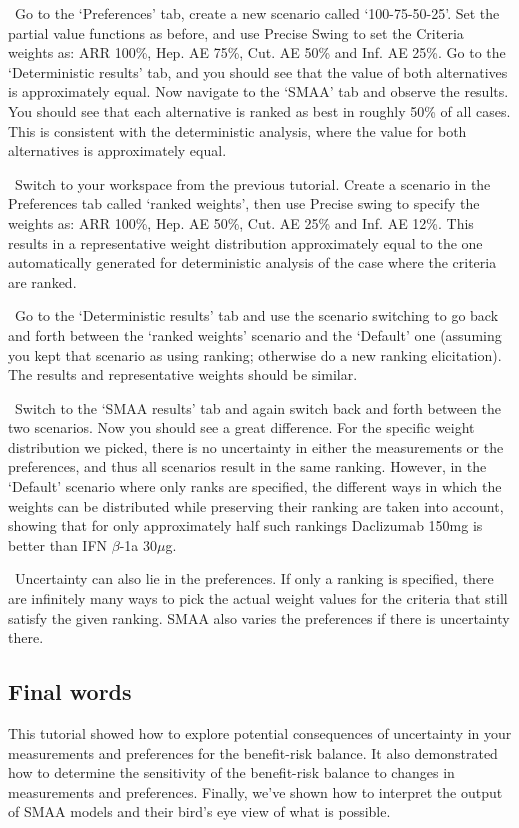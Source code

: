 \documentclass[00_mcda_tutorial.tex]{subfiles}
\begin{document}
\noindent \leftpointright \, Go to the ‘Preferences’ tab, create a new scenario called ‘100-75-50-25’. Set the partial value functions as before, and use Precise Swing to set the Criteria weights as:  ARR 100\%, Hep. AE 75\%, Cut. AE 50\% and Inf. AE 25\%. Go to the ‘Deterministic results’ tab, and you should see that the value of both alternatives is approximately equal. Now navigate to the ‘SMAA’ tab and observe the results. You should see that each alternative is ranked as best in roughly 50\% of all cases. This is consistent with the deterministic analysis, where the value for both alternatives is approximately equal.
\newline

\noindent \leftpointright \, Switch to your workspace from the previous tutorial. Create a scenario in the Preferences tab called ‘ranked weights’, then use Precise swing to specify the weights as:  ARR 100\%, Hep. AE 50\%, Cut. AE 25\% and Inf. AE 12\%. This results in a representative weight distribution approximately equal to the one automatically generated for deterministic analysis of the case where the criteria are ranked.
\newline

\noindent \leftpointright \, Go to the ‘Deterministic results’ tab and use the scenario switching to go back and forth between the ‘ranked weights’ scenario and the ‘Default’ one (assuming you kept that scenario as using ranking; otherwise do a new ranking elicitation). The results and representative weights should be similar.
\newline

\noindent \leftpointright \, Switch to the ‘SMAA results’ tab and again switch back and forth between the two scenarios. Now you should see a great difference. For the specific weight distribution we picked, there is no uncertainty in either the measurements or the preferences, and thus all scenarios result in the same ranking. However, in the ‘Default’ scenario where only ranks are specified, the different ways in which the weights can be distributed while preserving their ranking are taken into account, showing that for only approximately half such rankings Daclizumab 150mg is better than IFN $\beta$-1a 30$\mu$g.
\newline

\noindent \faGraduationCap \, Uncertainty can also lie in the preferences. If only a ranking is specified, there are infinitely many ways to pick the actual weight values for the criteria that still satisfy the given ranking. SMAA also varies the preferences if there is uncertainty there.

\subsection*{Final words}
This tutorial showed how to explore potential consequences of uncertainty in your measurements and preferences for the benefit-risk balance. It also demonstrated how to determine the sensitivity of the benefit-risk balance to changes in measurements and preferences. Finally, we’ve shown how to interpret the output of SMAA models and their bird’s eye view of what is possible.
\end{document}
